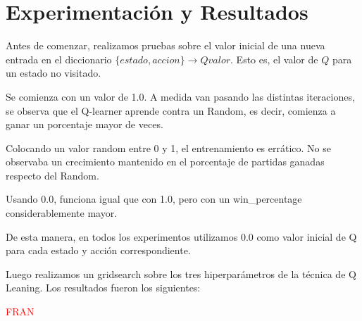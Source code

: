 \section{Experimentación y Resultados}

Antes de comenzar, realizamos pruebas sobre el valor inicial de una nueva entrada en el diccionario $\{estado, accion\} \rightarrow Q valor$. Esto es, el valor de $Q$ para un estado no visitado.

Se comienza con un valor de 1.0. A medida van pasando las distintas iteraciones, se observa que el Q-learner aprende contra un Random, es decir, comienza a ganar un porcentaje mayor de veces.

Colocando un valor random entre 0 y 1, el entrenamiento es errático. No se observaba un crecimiento mantenido en el porcentaje de partidas ganadas respecto del Random.

Usando 0.0, funciona igual que con 1.0, pero con un win\_percentage considerablemente mayor.

De esta manera, en todos los experimentos utilizamos 0.0 como valor inicial de Q para cada estado y acci\'on correspondiente.

Luego realizamos un gridsearch sobre los tres hiperpar\'ametros de la t\'ecnica de Q Leaning. Los resultados fueron los siguientes:

\textcolor{red}{FRAN}






